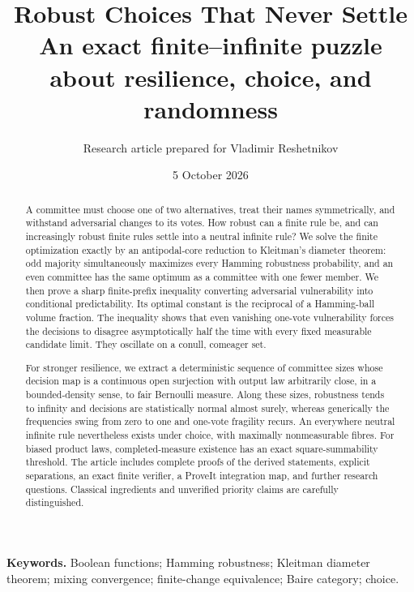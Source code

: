 \documentclass[11pt]{article}
\title{\textbf{Robust Choices That Never Settle}\\[5pt]
  \large An exact finite--infinite puzzle about resilience, choice, and randomness}
\author{Research article prepared for Vladimir Reshetnikov}
\date{5 October 2026}
\theoremstyle{definition}
\theoremstyle{remark}
\begin{document}
\maketitle
\begin{abstract}
A committee must choose one of two alternatives, treat their names symmetrically,
and withstand adversarial changes to its votes. How robust can a finite rule be,
and can increasingly robust finite rules settle into a neutral infinite rule?
We solve the finite optimization exactly by an antipodal-core reduction to
Kleitman's diameter theorem: odd majority simultaneously maximizes every Hamming
robustness probability, and an even committee has the same optimum as a committee
with one fewer member. We then prove a sharp finite-prefix inequality converting
adversarial vulnerability into conditional predictability. Its optimal constant
is the reciprocal of a Hamming-ball volume fraction. The inequality shows that
even vanishing one-vote vulnerability forces the decisions to disagree
asymptotically half the time with every fixed measurable candidate limit.
They oscillate on a conull, comeager set.

For stronger resilience, we extract a deterministic sequence of committee sizes
whose decision map is a continuous open surjection with output law arbitrarily
close, in a bounded-density sense, to fair Bernoulli measure. Along these sizes,
robustness tends to infinity and decisions are statistically normal almost
surely, whereas generically the frequencies swing from zero to one and
one-vote fragility recurs. An everywhere neutral infinite rule nevertheless
exists under choice, with maximally nonmeasurable fibres. For biased product
laws, completed-measure existence has an exact square-summability threshold.
The article includes complete proofs of the derived statements, explicit
separations, an exact finite verifier, a ProveIt integration map, and further
research questions. Classical ingredients and unverified priority claims are
carefully distinguished.
\end{abstract}

\noindent\textbf{Keywords.} Boolean functions; Hamming robustness; Kleitman diameter
theorem; mixing convergence; finite-change equivalence; Baire category; choice.
\end{document}
